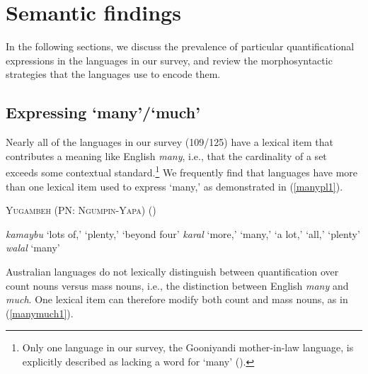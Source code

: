 \documentclass[12pt,egregdoesnotlikesansseriftitles]{scrartcl}
\newcommand{\ofy}{/125} %
\begin{document}
\section{Semantic findings \label{individquantsection}}

In the following sections, we discuss the prevalence of particular quantificational expressions in the languages in our survey, and review the morphosyntactic strategies that the languages use to encode them.

\subsection{Expressing `many'/`much' \label{manymuchsection}}

Nearly all of the languages in our survey (109\ofy) have a lexical item that contributes a meaning like English \textit{many}, i.e., that the cardinality of a set exceeds some contextual standard.\footnote{Only one language in our survey, the Gooniyandi mother-in-law language, is explicitly described as lacking a word for `many' (\citealt[636]{mcgregor89}).} We frequently find that languages  have more than one lexical item used to express `many,' as demonstrated in (\ref{manypl1}). %

\begin{exe}
  \ex  \textsc{Yugambeh (PN: Ngumpin-Yapa)} \hfill(\citealt{sharpe98}) \label{manypl1}\\
  \begin{xlist}
    \ex \textit{kamaybu} `lots of,' `plenty,' `beyond four'
    \ex \textit{karal} `more,' `many,' `a lot,' `all,' `plenty'
    \ex \textit{walal}  `many' 
  \end{xlist} 
\end{exe}

Australian languages do not lexically distinguish between quantification over count nouns versus mass nouns, i.e., the distinction between English \textit{many} and \textit{much}. One lexical item can therefore modify both count and mass nouns, as in (\ref{manymuch1}).
\end{document}
